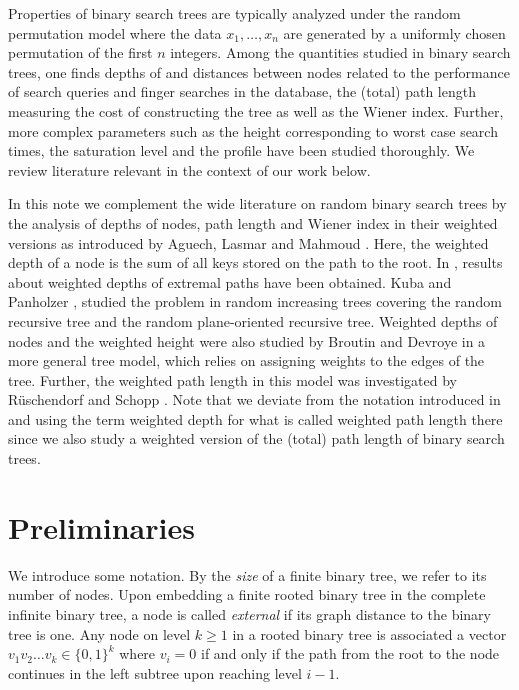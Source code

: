 \documentclass{amsart}       %
\begin{document}
Properties of binary search trees are typically analyzed under the random permutation model where the data $x_1, \ldots, x_n$ are generated by a uniformly chosen permutation of the first $n$ integers. Among the quantities studied in binary search trees, one finds depths of and distances between nodes related to the performance of search queries and finger searches in the database, the (total) path length measuring the cost of constructing the tree as well as the Wiener index. Further, more complex parameters such as  the height corresponding to worst case search times, the saturation level and the profile have been studied thoroughly. We review literature relevant in the context of our work below.

In this note we complement the wide literature on random binary search trees by the analysis of depths of nodes, path length and Wiener index in their weighted versions as introduced by Aguech, Lasmar and Mahmoud \cite{aglama07}. Here, the weighted depth of a node is the sum of all keys stored on the path to the root. In \cite{aglama07}, results about weighted depths of extremal paths have been obtained. Kuba and Panholzer \cite{kupa07}, \cite{kupa08} studied the problem in random increasing trees covering the random recursive tree and the random plane-oriented recursive tree.
Weighted depths of nodes and the weighted height were also studied by Broutin and Devroye \cite{brde} in a more general tree model, which relies on assigning weights to the edges of the tree.
Further, the weighted path length in this model was investigated by R{\"u}schendorf and Schopp \cite{ruschopp}.
Note that we deviate from the notation introduced in \cite{aglama07} and \cite{kupa07} using the term weighted depth for what is called weighted path length there since we also study a weighted version of the (total) path length of binary search trees.

\section{Preliminaries} \label{sec:not}

We introduce some notation. By the \emph{size} of a finite binary tree, we refer to its number of nodes. 
Upon embedding a finite rooted binary tree in the complete infinite binary tree, a node is called \emph{external} if its graph distance to the binary tree is one.
Any node on level $k \geq 1$ in a rooted binary tree is associated a vector $v_1 v_2 \ldots v_k \in \{0,1\}^k$ where $v_i = 0$ if and only if the path from the root to the node continues in the left subtree upon reaching level $i-1$. 
\end{document}
